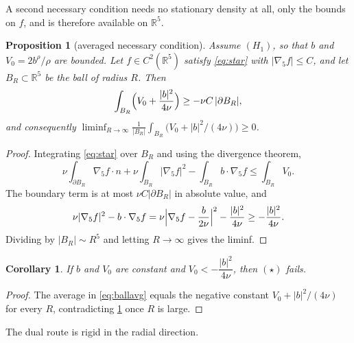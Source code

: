 \documentclass[11pt]{article}
\newtheorem{proposition}[theorem]{Proposition}
\newtheorem{corollary}[theorem]{Corollary}
\theoremstyle{definition}
\newcommand{\R}{\mathbb{R}}
\begin{document}
A second necessary condition needs no stationary density at all, only the
bounds on $f$, and is therefore available on $\R^5$.

\begin{proposition}[averaged necessary condition]\label{prop:ballavg}
Assume $(H_1)$, so that $b$ and $V_0=2b^\rho/\rho$ are bounded. Let
$f\in C^2(\R^5)$ satisfy \eqref{eq:star} with $|\nabla_5f|\le C$, and let
$B_R\subset\R^5$ be the ball of radius $R$. Then
\begin{equation}\label{eq:ballavg}
\int_{B_R}\Bigl(V_0+\frac{|b|^2}{4\nu}\Bigr)\ge-\nu C\,|\partial B_R|,
\end{equation}
and consequently
$\liminf_{R\to\infty}\frac{1}{|B_R|}\int_{B_R}\bigl(V_0+|b|^2/(4\nu)\bigr)\ge0$.
\end{proposition}
\begin{proof}
Integrating \eqref{eq:star} over $B_R$ and using the divergence theorem,
\begin{equation}
\nu\int_{\partial B_R}\nabla_5f\cdot n+\nu\int_{B_R}|\nabla_5f|^2
-\int_{B_R}b\cdot\nabla_5f\le\int_{B_R}V_0 .
\end{equation}
The boundary term is at most $\nu C|\partial B_R|$ in absolute value, and
\begin{equation}
\nu|\nabla_5f|^2-b\cdot\nabla_5f
=\nu\Bigl|\nabla_5f-\frac{b}{2\nu}\Bigr|^2-\frac{|b|^2}{4\nu}
\ge-\frac{|b|^2}{4\nu}.
\end{equation}
Dividing by $|B_R|\sim R^5$ and letting $R\to\infty$ gives the liminf.
\end{proof}

\begin{corollary}\label{cor:const}
If $b$ and $V_0$ are constant and $V_0<-\dfrac{|b|^2}{4\nu}$, then $(\star)$
fails.
\end{corollary}
\begin{proof}
The average in \eqref{eq:ballavg} equals the negative constant
$V_0+|b|^2/(4\nu)$ for every $R$, contradicting
\cref{prop:ballavg} once $R$ is large.
\end{proof}

The dual route is rigid in the radial direction.
\end{document}
